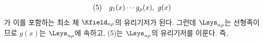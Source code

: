 
\[
\begin{array}{@{}l@{\quad}c@{}}
(5)&g_1(x)\cdots g_\rho(x),\ g(x)
\end{array}
\]
가 이를 포함하는 최소 체 $\Kfield_{n\rho}$의 유리기저가 된다. 그런데 $\Lsys_{n\rho}$는 선형족이므로 $g(x)$는 $\Lsys_{n\rho}$에 속하고, (5)는 $\Lsys_{n\rho}$의 유리기저를 이룬다. 즉,
